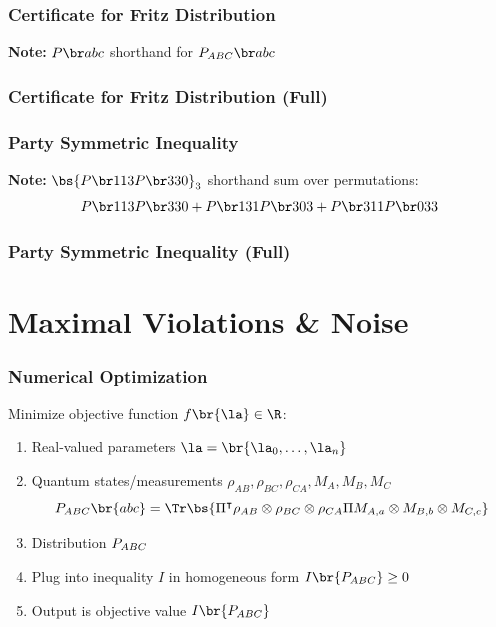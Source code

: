 \documentclass[
    hyperref={bookmarks=false},%
    xcolor={dvipsnames},
]{beamer}
\begin{document}
\begin{frame}
    \frametitle{Certificate for Fritz Distribution}
    
    \vfill
    \textbf{Note:} $\prob[][abc]$ shorthand for $\prob[ABC][abc]$
\end{frame}

\begin{frame}[shrink=64]
    \frametitle{Certificate for Fritz Distribution (Full)}
    \begin{center}
        
    \end{center}
\end{frame}

\begin{frame}
    \frametitle{Party Symmetric Inequality}
    
    \vfill
    \textbf{Note:} $\bs{\prob[][113]\prob[][330]}_3$ shorthand sum over permutations:
    \[ \prob[][113]\prob[][330] + \prob[][131]\prob[][303] + \prob[][311]\prob[][033] \]
\end{frame}

\begin{frame}[shrink=60]
    \frametitle{Party Symmetric Inequality (Full)}
    
\end{frame}

\section{Maximal Violations \& Noise}

\begin{frame}
    \frametitle{Numerical Optimization}
    Minimize objective function $f\br{\la} \in \R$:
    \begin{enumerate}
        \item Real-valued parameters $\la = \br{\la_0, \ldots, \la_n}$
        \item Quantum states/measurements $\rho_{AB}, \rho_{BC}, \rho_{CA}, M_{A}, M_{B}, M_{C}$
    \[ \prob[ABC]\br{abc} = \Tr\bs{\netperm^\intercal \rho_{AB}\otimes\rho_{BC}\otimes\rho_{CA} \netperm M_{A,a}\otimes M_{B,b} \otimes M_{C,c}} \]
        \item Distribution $\prob[ABC]$
        \item Plug into inequality $I$ in homogeneous form $I\br{\prob[ABC]} \geq 0$
        \item Output is objective value $I\br{\prob[ABC]}$
    \end{enumerate}
\end{frame}
\end{document}
